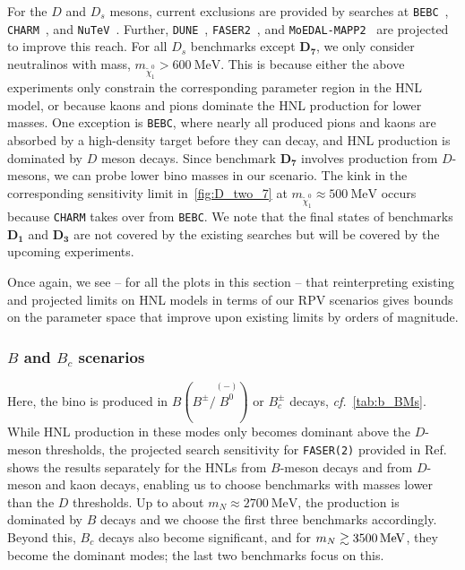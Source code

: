 For the $D$ and $D_s$ mesons, current exclusions are provided by searches at 
\texttt{BEBC}~\cite{WA66:1985mfx, Barouki:2022bkt}, \texttt{CHARM}~\cite{CHARM:1985nku}, 
and \texttt{NuTeV}~\cite{NuTeV:1999kej}.
Further, \texttt{DUNE}~\cite{Ballett:2019bgd}, \texttt{FASER2}~\cite{Kling:2018wct}, and \texttt{MoEDAL-MAPP2}~\cite{DeVries:2020jbs,Beltran:2023nli} are projected to improve this reach. For all $D_s$ benchmarks except 
$\bm{D_7}$, we only consider neutralinos with mass, $m_{\tilde{\chi}^0_1} > \SI{600}{\MeV}$.
This is because either the above experiments only constrain the corresponding parameter 
region in the HNL model, or because kaons and pions dominate the HNL production for 
lower masses. One exception is \texttt{BEBC}, where nearly all produced pions and kaons 
are absorbed by a high-density target before they can decay, and HNL production is 
dominated by $D$ meson decays. Since benchmark $\bm{D_7}$ involves production from 
$D$-mesons, we can probe lower bino masses in our scenario.
The kink in the corresponding sensitivity limit in~\cref{fig:D_two_7} at $m_{\tilde{\chi}_1^0} \approx \SI{500}{\MeV}$ occurs because \texttt{CHARM} takes over from \texttt{BEBC}.
We note that the final states of benchmarks $\bm{D_1}$ and $\bm{D_3}$ are not covered by the existing searches but will be covered by the upcoming experiments. 


Once again, we see -- for all the plots in this section -- that reinterpreting existing 
and projected limits on HNL models in terms of our RPV scenarios gives bounds on the 
parameter space that improve upon existing limits by orders of magnitude.


\subsubsection{$B$ and $B_c$ scenarios} 
%
Here, the bino is produced in $B (B^\pm/\overset{\scriptscriptstyle(-)}{B^0})$ or $B^\pm_c$ 
decays, \textit{cf.}~\cref{tab:b_BMs}. While HNL production in these 
modes only becomes dominant above the $D$-meson thresholds, the projected search 
sensitivity for \texttt{FASER(2)} provided in Ref.~\cite{Kling:2018wct} shows the results separately for the HNLs from $B$-meson decays and from $D$-meson and kaon 
decays, enabling us to choose benchmarks with masses lower than the $D$ thresholds. Up 
to about $m_N \approx \SI{2700}{\MeV}$, the production is dominated by $B$ decays and we choose 
the first three benchmarks accordingly. Beyond this, $B_c$ decays also become 
significant, and for $m_N \gsim \SI{3500}{\MeV}$, they become the dominant modes; 
the last two benchmarks focus on this.

